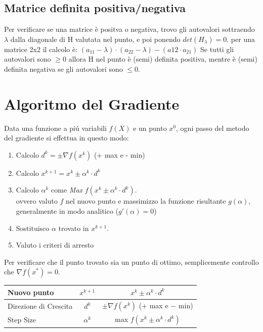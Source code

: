 \documentclass[12pt, a4paper, openany]{book}
\begin{document}
\subsection{Matrice definita positiva/negativa}
Per verificare se una matrice è positva o negativa, trovo gli autovalori sottraendo $\lambda$ dalla diagonale di H valutata nel punto, e poi ponendo $det(H_\lambda) = 0$.
per una matrice 2x2 il calcolo è: $(a_{11}-\lambda)\cdot(a_{22} - \lambda) - (a{12} \cdot a_{21})$
Se tutti gli autovalori sono $\geq 0$ allora H nel punto è (semi) definita positiva, mentre è (semi) definita negativa se gli autovalori sono $\leq 0$.

\section{Algoritmo del Gradiente}
Data una funzione a piú variabili $f(X)$ e un punto $x^0$, ogni passo del metodo del gradiente si effettua in questo modo:

\begin{enumerate}
	\item Calcolo $d^k=\pm \nabla f(x^k)$ ($+$ max e - min)
	\item Calcolo $x^{k+1} = x^k \pm \alpha^k \cdot d^k$
	\item Calcolo $\alpha^k$ come \emph{Max} $f(x^k \pm \alpha^k \cdot d^k)$.
			\\\small{ovvero valuto $f$ nel nuovo punto e massimizzo la funzione risultante $g(\alpha)$, generalmente in modo analitico ($g'(\alpha)=0$)}
	\item Sostituisco $\alpha$ trovato in $x^{k+1}$.
	\item Valuto i criteri di arresto
\end{enumerate}
Per verificare che il punto trovato sia un punto di ottimo, semplicemente controllo che $\nabla f(x^*) = 0$.
\begin{center}
	\begin{tabular}{|l|c|c|}
		\hline
		Nuovo punto & $x^{k+1}$ & $ x^k \pm \alpha^k \cdot d^k$\\
		\hline
		Direzione di Crescita & $d^k$ & $\pm \nabla f(x^k)$ ($+$ max e $-$ min)\\
		\hline
		Step Size & $\alpha^k$ & max $f(x^k \pm \alpha^k \cdot d^k)$\\
		\hline
	\end{tabular}
\end{center}

\pagebreak
\end{document}
